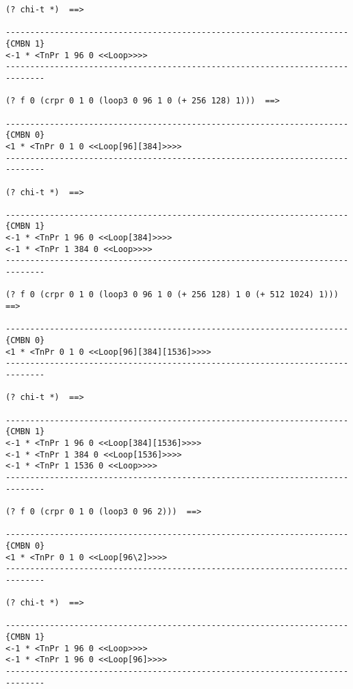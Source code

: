 \newpage
{\footnotesize\begin{verbatim}
(? chi-t *)  ==>

----------------------------------------------------------------------{CMBN 1}
<-1 * <TnPr 1 96 0 <<Loop>>>>
------------------------------------------------------------------------------

(? f 0 (crpr 0 1 0 (loop3 0 96 1 0 (+ 256 128) 1)))  ==>

----------------------------------------------------------------------{CMBN 0}
<1 * <TnPr 0 1 0 <<Loop[96][384]>>>>
------------------------------------------------------------------------------

(? chi-t *)  ==>

----------------------------------------------------------------------{CMBN 1}
<-1 * <TnPr 1 96 0 <<Loop[384]>>>>
<-1 * <TnPr 1 384 0 <<Loop>>>>
------------------------------------------------------------------------------

(? f 0 (crpr 0 1 0 (loop3 0 96 1 0 (+ 256 128) 1 0 (+ 512 1024) 1)))  ==>

----------------------------------------------------------------------{CMBN 0}
<1 * <TnPr 0 1 0 <<Loop[96][384][1536]>>>>
------------------------------------------------------------------------------

(? chi-t *)  ==>

----------------------------------------------------------------------{CMBN 1}
<-1 * <TnPr 1 96 0 <<Loop[384][1536]>>>>
<-1 * <TnPr 1 384 0 <<Loop[1536]>>>>
<-1 * <TnPr 1 1536 0 <<Loop>>>>
------------------------------------------------------------------------------

(? f 0 (crpr 0 1 0 (loop3 0 96 2)))  ==>

----------------------------------------------------------------------{CMBN 0}
<1 * <TnPr 0 1 0 <<Loop[96\2]>>>>
------------------------------------------------------------------------------

(? chi-t *)  ==>

----------------------------------------------------------------------{CMBN 1}
<-1 * <TnPr 1 96 0 <<Loop>>>>
<-1 * <TnPr 1 96 0 <<Loop[96]>>>>
------------------------------------------------------------------------------
\end{verbatim}}
\newpage
